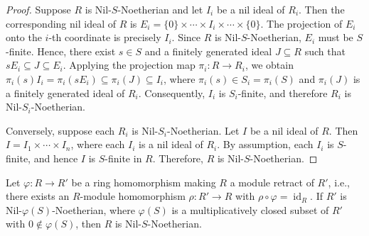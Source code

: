 \documentclass[11pt]{article}
\begin{document}
\begin{proof}
Suppose $R$ is Nil-$S$-Noetherian and let $I_{i}$ be a nil ideal of $R_{i}$. Then the corresponding nil ideal of $R$ is $E_{i}=\{0\}\times \cdots \times I_{i}\times \cdots \times \{0\}$. The projection of $E_{i}$ onto the $i$-th coordinate is precisely $I_{i}$. 
Since $R$ is Nil-$S$-Noetherian, $E_{i}$ must be $S$-finite. Hence, there exist $s\in S$ and a finitely generated ideal $J\subseteq R$ such that $sE_{i}\subseteq J \subseteq E_{i}$. Applying the projection map $\pi_{i}:R\to R_{i}$, we obtain $\pi_{i}(s)I_{i}=\pi_{i}(sE_{i}) \subseteq \pi_{i}(J)\subseteq I_{i}$, where $\pi_{i}(s)\in S_{i}=\pi_{i}(S)$ and $\pi_{i}(J)$ is a finitely generated ideal of $R_{i}$. Consequently, $I_{i}$ is $S_{i}$-finite, and therefore 
$R_{i}$ is Nil-$S_{i}$-Noetherian.

Conversely, suppose each $R_{i}$ is Nil-$S_{i}$-Noetherian. Let $I$ be a nil ideal of $R$. Then $I = I_{1} \times \cdots \times I_{n}$, where each $I_{i}$ is a nil ideal of $R_{i}$. By assumption, each $I_{i}$ is $S$-finite, and hence $I$ is $S$-finite in $R$. Therefore, $R$ is Nil-$S$-Noetherian.
\end{proof}

\begin{prop}
Let $\varphi:R\to R'$ be a ring homomorphism making $R$ a module
retract of $R'$, i.e., there exists an $R$-module homomorphism $\rho:R'\to R$ with $\rho\circ\varphi=\operatorname{id}_R$. If $R'$ is Nil-$\varphi(S)$-Noetherian, where $\varphi(S)$ is a multiplicatively closed subset of $R'$ with $0\notin \varphi(S)$, then $R$ is Nil-$S$-Noetherian.
\end{prop}
\end{document}
